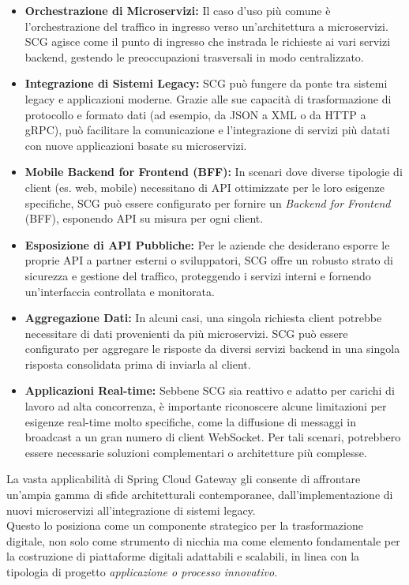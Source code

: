 \begin{itemize}
    \item \textbf{Orchestrazione di Microservizi:} Il caso d'uso più comune è l'orchestrazione del traffico in ingresso verso un'architettura a microservizi. SCG agisce come il punto di ingresso che instrada le richieste ai vari servizi backend, gestendo le preoccupazioni trasversali in modo centralizzato.
    \item \textbf{Integrazione di Sistemi Legacy:} SCG può fungere da ponte tra sistemi legacy e applicazioni moderne. Grazie alle sue capacità di trasformazione di protocollo e formato dati (ad esempio, da JSON a XML o da HTTP a gRPC), può facilitare la comunicazione e l'integrazione di servizi più datati con nuove applicazioni basate su microservizi.
    \item \textbf{Mobile Backend for Frontend (BFF):} In scenari dove diverse tipologie di client (es. web, mobile) necessitano di API ottimizzate per le loro esigenze specifiche, SCG può essere configurato per fornire un \textit{Backend for Frontend} (BFF), esponendo API su misura per ogni client.
    \item \textbf{Esposizione di API Pubbliche:} Per le aziende che desiderano esporre le proprie API a partner esterni o sviluppatori, SCG offre un robusto strato di sicurezza e gestione del traffico, proteggendo i servizi interni e fornendo un'interfaccia controllata e monitorata.
    \item \textbf{Aggregazione Dati:} In alcuni casi, una singola richiesta client potrebbe necessitare di dati provenienti da più microservizi. SCG può essere configurato per aggregare le risposte da diversi servizi backend in una singola risposta consolidata prima di inviarla al client.
    \item \textbf{Applicazioni Real-time:} Sebbene SCG sia reattivo e adatto per carichi di lavoro ad alta concorrenza, è importante riconoscere alcune limitazioni per esigenze real-time molto specifiche, come la diffusione di messaggi in broadcast a un gran numero di client WebSocket. Per tali scenari, potrebbero essere necessarie soluzioni complementari o architetture più complesse.
\end{itemize}

La vasta applicabilità di Spring Cloud Gateway gli consente di affrontare un'ampia gamma di sfide architetturali contemporanee, dall'implementazione di nuovi microservizi all'integrazione di sistemi legacy. \\
Questo lo posiziona come un componente strategico per la trasformazione digitale, non solo come strumento di nicchia ma come elemento fondamentale per la costruzione di piattaforme digitali adattabili e scalabili, in linea con la tipologia di progetto \textit{applicazione o processo innovativo}.